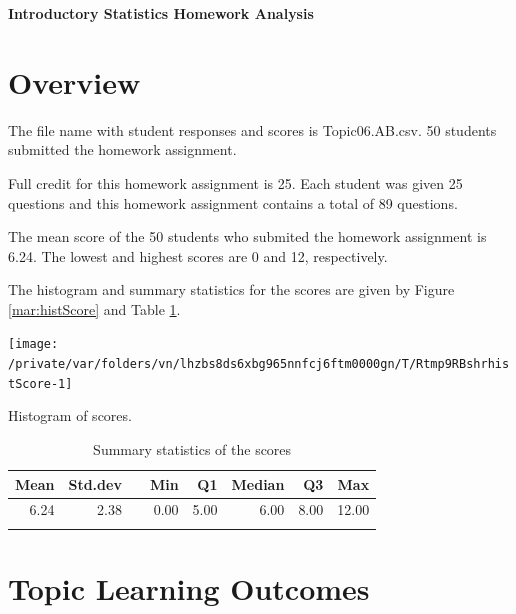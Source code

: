 \documentclass[12pt,english,nohyper]{tufte-handout}\usepackage[]{graphicx}\usepackage[]{color}
\newenvironment{knitrout}{}{} %
\begin{document}
\setcaptionfont{
  \normalfont\footnotesize
  \color{black}
}





\centerline{\Large\bf Introductory Statistics Homework Analysis}


\section{Overview}
The file name with student responses and scores is Topic06.AB.csv. 50 students submitted the homework assignment.

Full credit for this homework assignment is 25. Each student was given 25 questions and this homework assignment contains a total of 89 questions.  

The mean score of the 50 students who submited the homework assignment is 6.24. The lowest and highest scores are 0 and 12, respectively.

The histogram and summary statistics for the scores are given by Figure \ref{mar:histScore} and Table \ref{tab:summary}.

\begin{knitrout}
\color{fgcolor}\begin{marginfigure}
\texttt{[image: /private/var/folders/vn/lhzbs8ds6xbg965nnfcj6ftm0000gn/T/Rtmp9RBshrhistScore-1]} \caption[Histogram of scores]{Histogram of scores.}\label{mar:histScore}
\end{marginfigure}


\end{knitrout}

\begin{longtable}{rrlrrrrr}
  \hline
Mean & Std.dev &   & Min & Q1 & Median & Q3 & Max \\ 
  \hline
6.24 & 2.38 &  & 0.00 & 5.00 & 6.00 & 8.00 & 12.00 \\ 
   \hline
\hline
\caption{Summary statistics of the scores} 
\label{tab:summary}
\end{longtable}


\clearpage
\newpage{}
\section{Topic Learning Outcomes}

\bigskip{}
\end{document}
